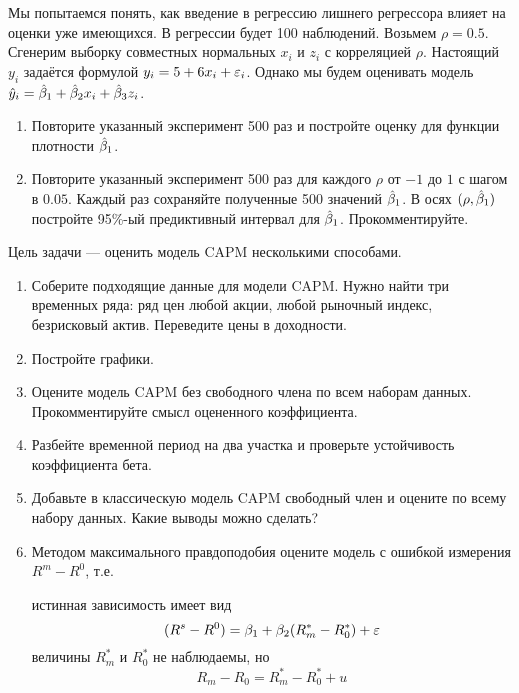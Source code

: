 \begin{problem}
Мы попытаемся понять, как введение в регрессию лишнего регрессора влияет на оценки уже имеющихся. В регрессии будет 100 наблюдений. Возьмем $\rho=0.5$. Сгенерим выборку совместных нормальных $x_i$ и $z_i$ с корреляцией $\rho$. Настоящий $y_i$ задаётся формулой $y_i=5+6x_i+\varepsilon_i$. Однако мы будем оценивать модель $\hat{y}_i=\hat{\beta}_1+\hat{\beta}_2 x_i+\hat{\beta}_3 z_i$.

\begin{enumerate}
\item Повторите указанный эксперимент 500 раз и постройте оценку для функции плотности $\hat{\beta}_1$.
\item Повторите указанный эксперимент 500 раз для каждого $\rho$ от $-1$ до $1$ с шагом в $0.05$. Каждый раз сохраняйте полученные 500 значений $\hat{\beta}_1$. В осях $(\rho,\hat{\beta}_1)$ постройте 95\%-ый предиктивный интервал для $\hat{\beta}_1$. Прокомментируйте.
\end{enumerate}


\begin{sol}
\end{sol}
\end{problem}


\begin{problem}
Цель задачи — оценить модель CAPM несколькими способами.
\begin{enumerate}
\item Соберите подходящие данные для модели CAPM. Нужно найти три временных ряда: ряд цен любой акции, любой рыночный индекс, безрисковый актив. Переведите цены в доходности.
\item Постройте графики.
\item Оцените модель CAPM без свободного члена по всем наборам данных. Прокомментируйте смысл оцененного коэффициента.
\item Разбейте временной период на два участка и проверьте устойчивость коэффициента бета.
\item Добавьте в классическую модель CAPM свободный член и оцените по всему набору данных. Какие выводы можно сделать?
\item Методом максимального правдоподобия оцените модель с ошибкой измерения $R^m-R^0$, т.е.

истинная зависимость имеет вид
\begin{equation*}
(R^s-R^0)=\beta_1+\beta_2(R_m^*-R_0^*)+\varepsilon
\end{equation*}
величины $R_m^*$ и $R_0^*$ не наблюдаемы, но
\begin{equation*}
R_m-R_0=R_m^*-R_0^*+u
\end{equation*}

\end{enumerate}


\begin{sol}
\end{sol}
\end{problem}








